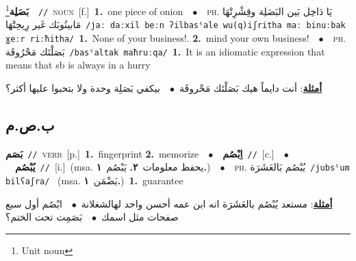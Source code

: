\documentclass[10pt,a4paper,twoside]{article} %
\begin{document}
\begin{multicols}{2}
{\setlength\topsep{0pt}\textbf{\foreignlanguage{arabic}{بَصَلِة}}\footnote{Unit noun}\ \ {\color{gray}\texttt{//}\color{black}}\ \textsc{noun}\ [f.]\ \textbf{1.}~one piece of onion\ \ $\bullet$\ \ \textsc{ph.} \color{gray} \foreignlanguage{arabic}{يَا دَاخِل بَين البَصَلِة وقِشْرِتْهَا مَابينُوبَك غَير رِيحِتْهَا}\color{black}\ {\color{gray}\texttt{/{\sffamily jaː daːxil beːn ʔilbasˤale wu(q)iʃritha maː binuːbak ɣeːr riːħitha}/}\color{black}}\ \textbf{1.}~None of your business!.  \textbf{2.}~mind your own business!\ \ $\bullet$\ \ \textsc{ph.} \color{gray} \foreignlanguage{arabic}{بَصَلْتَك مَحْرُوقَة}\color{black}\ {\color{gray}\texttt{/{\sffamily basˤaltak maħruːqa}/}\color{black}}\ \textbf{1.}~It is an idiomatic expression that means that sb is always in a hurry\  \begin{flushright}\color{gray}\foreignlanguage{arabic}{\textbf{\underline{\foreignlanguage{arabic}{أمثلة}}}: أنت دايماً هيك بَصَلْتَك مَحْروقَة\ $\bullet$\ \  بيكفي بَصَلِة وحدة ولا بتحبوا عليها أكثر؟}\end{flushright}\color{black}} \vspace{2mm}

\vspace{-3mm}
\subsection*{\color{blue}\foreignlanguage{arabic}{ب.ص.م}\color{blue}{}} 

{\setlength\topsep{0pt}\textbf{\foreignlanguage{arabic}{بَصَم}}\ {\color{gray}\texttt{//}\color{black}}\ \textsc{verb}\ [p.]\ \textbf{1.}~fingerprint  \textbf{2.}~memorize\ \ $\bullet$\ \ \setlength\topsep{0pt}\textbf{\foreignlanguage{arabic}{اِبْصُم}}\ {\color{gray}\texttt{//}\color{black}}\ [c.]\ \ $\bullet$\ \ \setlength\topsep{0pt}\textbf{\foreignlanguage{arabic}{يُبْصُم}}\ {\color{gray}\texttt{//}\color{black}}\ [i.]\ \color{gray}(msa. \foreignlanguage{arabic}{يحفظ معلومات}~\foreignlanguage{arabic}{\textbf{٢.}}  \foreignlanguage{arabic}{يَبْصُم}~\foreignlanguage{arabic}{\textbf{١.}})\color{black}\ \ $\bullet$\ \ \textsc{ph.} \color{gray} \foreignlanguage{arabic}{يُبْصُم بَالعَشَرَة}\color{black}\ {\color{gray}\texttt{/{\sffamily jubsˤum bilʕaʃra}/}\color{black}}\ \color{gray} (msa. \foreignlanguage{arabic}{يَضْمَن}~\foreignlanguage{arabic}{\textbf{١.}})\color{black}\ \textbf{1.}~guarantee\  \begin{flushright}\color{gray}\foreignlanguage{arabic}{\textbf{\underline{\foreignlanguage{arabic}{أمثلة}}}: مستعد يُبْصُم بالعَشَرَة انه ابن عمه أحسن واحد لهالشغلانة\ $\bullet$\ \  ابْصُم أول سبع صفحات مثل اسمك\ $\bullet$\ \  بَصَمِت تحت الختم؟}\end{flushright}\color{black}} \vspace{2mm}


\end{multicols}
\end{document}
